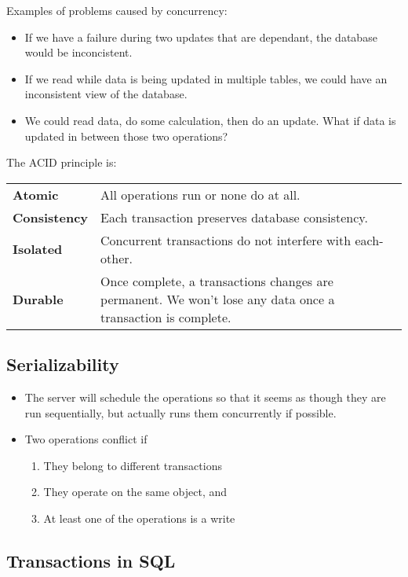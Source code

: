 \documentclass[12pt]{article}
\begin{document}
Examples of problems caused by concurrency:
\begin{itemize}
	\item If we have a failure during two updates that are dependant, the
		database would be inconcistent.
	\item If we read while data is being updated in multiple tables, we could
		have an inconsistent view of the database.
	\item We could read data, do some calculation, then do an update. What if
		data is updated in between those two operations?
\end{itemize}

The ACID principle is:

\begin{tabular}{lp{}}
	\textbf{Atomic} & All operations run or none do at all.\\
	\textbf{Consistency} & Each transaction preserves database consistency.\\
	\textbf{Isolated} & Concurrent transactions do not interfere with each-other.\\
	\textbf{Durable} & Once complete, a transactions changes are permanent. We
	won't lose any data once a transaction is complete.\\
\end{tabular}

\subsection{Serializability}

\begin{itemize}
	\item The server will schedule the operations so that it seems as though
		they are run sequentially, but actually runs them concurrently if
		possible.
	\item Two operations conflict if
		\begin{enumerate}
			\item They belong to different transactions
			\item They operate on the same object, and
			\item At least one of the operations is a write
		\end{enumerate}
\end{itemize}

\subsection{Transactions in SQL}
\end{document}
